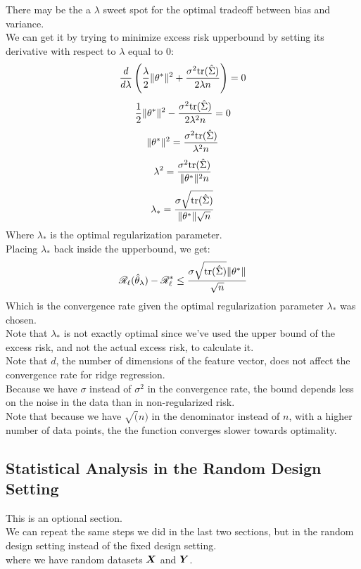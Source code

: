 \documentclass[12pt]{article}
\begin{document}
There may be the a $\lambda$ sweet spot
for the optimal tradeoff between bias
and variance. \\
We can get it by trying to minimize
excess risk upperbound by setting its derivative
with respect to $\lambda$ equal to $0$:
\[ \dfrac{d}{d\lambda}\left(  \dfrac{\lambda}{2}\|\theta^*\|^2 +
\dfrac{\sigma^2 \text{tr}(\hat{\Sigma})}{2\lambda n} \right) = 0 \]
\[ \dfrac{1}{2}\|\theta^*\|^2 -
\dfrac{\sigma^2 \text{tr}(\hat{\Sigma})}{2\lambda^2 n} = 0 \]
\[ \|\theta^*\|^2 =
\dfrac{\sigma^2 \text{tr}(\hat{\Sigma})}{\lambda^2 n} \]
\[ \lambda^2 =
\dfrac{\sigma^2 \text{tr}(\hat{\Sigma})}{\|\theta^*\|^2 n} \]
\[ \lambda_* =
\dfrac{\sigma \sqrt{\text{tr}(\hat{\Sigma})}}
{\|\theta^*\| \sqrt{n}} \]
Where $\lambda_*$ is the optimal 
regularization parameter. \\

Placing $\lambda_*$
back inside the upperbound, we get:
\[ \mathscr{R}_{\ell}(\hat{\theta}_\lambda) - \mathscr{R}_{\ell}^*
\leq \dfrac{\sigma \sqrt{\text{tr}(\hat{\Sigma})} \|\theta^*\| }
{\sqrt{n}} \]
Which is the convergence rate given the optimal
regularization parameter $\lambda_*$ was chosen. \\

Note that $\lambda_*$ is not exactly
optimal since we've used
the upper bound of the excess risk,
and not the actual excess risk,
to calculate it. \\

Note that $d$, the number of dimensions of the feature
vector, does not affect the convergence rate
for ridge regression. \\

Because we have $\sigma$ instead of $\sigma^2$
in the convergence rate, the bound depends less
on the noise in the data than in non-regularized 
risk. \\

Note that because we have $\sqrt(n)$
in the denominator instead of $n$,
with a higher number of data points, the
the function converges slower towards optimality. \\

\newpage

\subsection*{Statistical Analysis in the Random 
Design Setting}

This is an optional section. \\

We can repeat the same steps we did in the last
two sections, but in the random design setting
instead of the fixed design setting. \\
where we have random datasets $\boldsymbol{X}$ and $\boldsymbol{Y}$. \\
\end{document}
